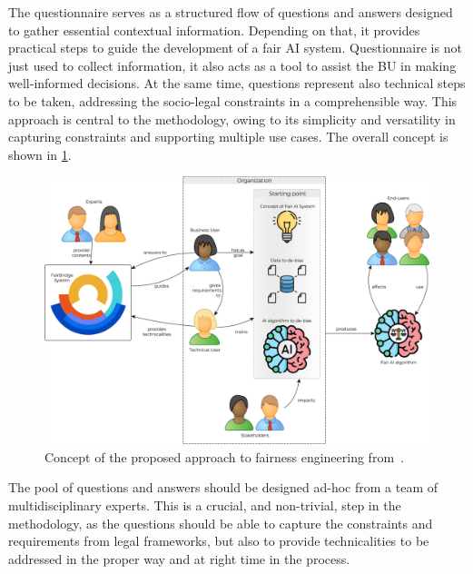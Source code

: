 \documentclass[12pt,a4paper,openright,twoside]{book}
\begin{document}
The questionnaire serves as a structured flow of questions and answers designed to gather essential contextual information. Depending on that, it provides practical steps to guide the development of a fair \ac{AI} system.
%
Questionnaire is not just used to collect information, it also acts as a tool to assist the \ac{BU} in making well-informed decisions. At the same time, questions represent also technical steps to be taken, addressing the socio-legal constraints in a comprehensible way.
%
This approach is central to the methodology, owing to its simplicity and versatility in capturing constraints and supporting multiple use cases.
%
The overall concept is shown in \cref{fig:concept}.

\begin{figure}
    \centering
    \includegraphics[width=0.90\linewidth]{figures/concept.pdf}
    \caption{Concept of the proposed approach to fairness engineering from~\cite{hicssfairness2025}.}
    \label{fig:concept}
\end{figure}

The pool of questions and answers should be designed ad-hoc from a team of multidisciplinary experts. 
%
This is a crucial, and non-trivial, step in the methodology, as the questions should be able to capture the constraints and requirements from legal frameworks, but also to provide technicalities to be addressed in the proper way and at right time in the process.
\end{document}

